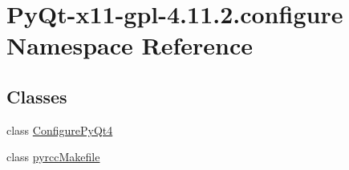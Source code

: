\hypertarget{namespacePyQt-x11-gpl-4_811_82_1_1configure}{}\section{Py\+Qt-\/x11-\/gpl-\/4.11.2.configure Namespace Reference}
\label{namespacePyQt-x11-gpl-4_811_82_1_1configure}
\subsection*{Classes}
\begin{DoxyCompactItemize}
\item 
class \hyperlink{classPyQt-x11-gpl-4_811_82_1_1configure_1_1ConfigurePyQt4}{Configure\+Py\+Qt4}
\item 
class \hyperlink{classPyQt-x11-gpl-4_811_82_1_1configure_1_1pyrccMakefile}{pyrcc\+Makefile}
\end{DoxyCompactItemize}
